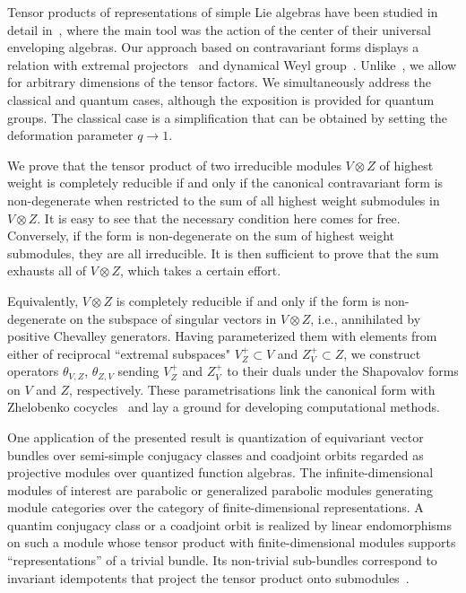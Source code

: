 \documentclass[pdftex]{sigma}
\numberwithin{equation}{section}
\begin{document}
Tensor products of representations of simple Lie algebras have been studied in detail in~\cite{BG, K}, where the main tool was the action of the center of their universal enveloping algebras. Our approach based on contravariant forms displays a relation with extremal projectors~\cite{AST,KT} and dynamical Weyl group~\cite{EV}. Unlike~\cite{BG}, we allow for arbitrary dimensions of the tensor factors. We simultaneously address the classical and quantum cases, although the exposition is provided for quantum groups. The classical case is a simplification that can be obtained by setting the deformation parameter $q\to 1$.

We prove that the tensor product of two irreducible modules $V\otimes Z$ of highest weight is completely reducible if and only if the canonical contravariant form is non-degenerate when restricted to the sum of all highest weight submodules in $V\otimes Z$. It is easy to see that the necessary condition here comes for free. Conversely, if the form is non-degenerate on the sum of highest weight submodules, they are all irreducible. It is then sufficient to prove that the sum exhausts all of $V\otimes Z$, which takes a certain effort.

Equivalently, $V\otimes Z$ is completely reducible if and only if the form is non-degenerate on the subspace of singular vectors in $V\otimes Z$, i.e., annihilated by positive Chevalley generators. Having parameterized them with elements from either of reciprocal ``extremal subspaces" $V^+_Z\subset V$ and $Z^+_V\subset Z$, we construct operators $\theta_{V,Z}$, $\theta_{Z,V}$ sending $V^+_Z$ and $Z^+_V$ to their duals under the Shapovalov forms on $V$ and $Z$, respectively. These parametrisations link the canonical form with Zhelobenko cocycles~\cite{Zh} and lay a ground for developing computational methods.

One application of the presented result is quantization of equivariant vector bundles over semi-simple conjugacy classes and coadjoint orbits regarded as projective modules over quantized function algebras.
The infinite-dimensional modules of interest are parabolic or generalized parabolic modules generating module categories over the category of finite-dimensional representations. A quantim conjugacy class or a coadjoint orbit is realized by linear endomorphisms on such a module whose tensor product with finite-dimensional modules supports ``representations'' of a trivial bundle. Its non-trivial sub-bundles correspond to invariant idempotents that project the tensor product onto submodules~\cite{M1,M2}.
\end{document}
